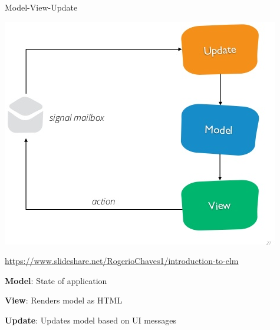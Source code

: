 \documentclass[11.5pt, aspectratio=169]{beamer}
\begin{document}
\begin{frame}{Model-View-Update}

  \begin{center}
    \includegraphics[scale=1.3]{images/mvu.png}

    \hfill {\tiny \url{https://www.slideshare.net/RogerioChaves1/introduction-to-elm}}
  \end{center}

  \begin{fullpageitemize}
  \item {\Large \textbf{Model}: State of application}
  \item {\Large \textbf{View}: Renders model as HTML}
  \item {\Large \textbf{Update}: Updates model based on UI messages}
  \end{fullpageitemize}

\end{frame}
\end{document}
